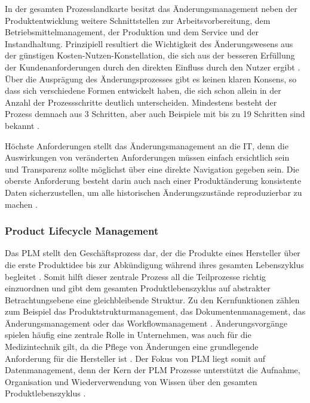 \documentclass[a4paper,12pt]{report}
\begin{document}
In der gesamten Prozesslandkarte besitzt das Änderungsmanagement neben der Produktentwicklung weitere Schnittstellen zur Arbeitsvorbereitung, dem Betriebsmittelmanagement, der Produktion und dem Service und der Instandhaltung. Prinzipiell resultiert die Wichtigkeit des Änderungswesens aus der günstigen Kosten-Nutzen-Konstellation, die sich aus der besseren Erfüllung der Kundenanforderungen durch den direkten Einfluss durch den Nutzer ergibt \citep[vgl.][]{Wu2014}.  Über die Ausprägung des Änderungsprozesses gibt es keinen klaren Konsens, so dass sich verschiedene Formen entwickelt haben, die sich schon allein in der Anzahl der Prozessschritte deutlich unterscheiden. Mindestens besteht der Prozess demnach aus 3 Schritten, aber auch Beispiele mit bis zu 19 Schritten sind bekannt \citep[vgl.][S. 155]{Stark2015}.

Höchste Anforderungen stellt das Änderungsmanagement an die IT, denn die Auswirkungen von veränderten Anforderungen müssen einfach ersichtlich sein und Transparenz sollte möglichst über eine direkte Navigation gegeben sein. Die oberste Anforderung besteht darin auch nach einer Produktänderung konsistente Daten sicherzustellen, um alle historischen Änderungszustände reproduzierbar zu machen \citep[vgl.][S. 85]{Scheer2006}.


\subsubsection{Product Lifecycle Management}
Das \ac{PLM} stellt den Geschäftsprozess dar, der die Produkte eines Hersteller über die erste Produktidee bis zur Abkündigung während ihres gesamten Lebenszyklus begleitet \citep[vgl.][S. 203]{Kale2016}. Somit hilft dieser zentrale Prozess all die Teilprozesse richtig einzuordnen und gibt dem gesamten Produktlebenszyklus auf abstrakter Betrachtungsebene eine gleichbleibende Struktur. Zu den Kernfunktionen zählen zum Beispiel das Produktstrukturmanagement, das Dokumentenmanagement, das Änderungsmanagement oder das Workflowmanagement \citep[vgl.][S. 44]{Saaksvuori2008}. Änderungsvorgänge spielen häufig eine zentrale Rolle in Unternehmen, was auch für die Medizintechnik gilt, da die Pflege von Änderungen eine grundlegende Anforderung für die Hersteller ist \citep[vgl.][S. 175]{Arnold2011}. Der Fokus von \ac{PLM} liegt somit auf Datenmanagement, denn der Kern der PLM Prozesse unterstützt die Aufnahme, Organisation und Wiederverwendung von Wissen über den gesamten Produktlebenszyklus \citep[vgl.][S. 46]{Tayaran2012}.
\end{document}
